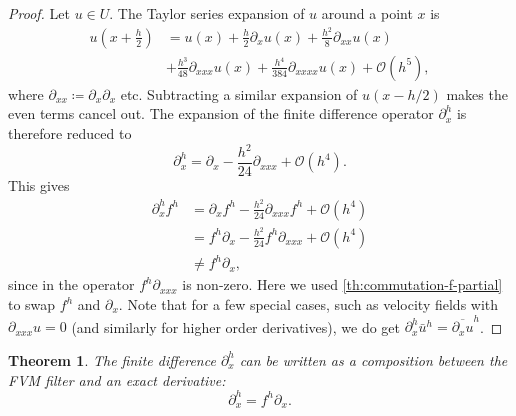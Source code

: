 \documentclass[preprint,twocolumn,5p]{elsarticle}
\newtheorem{theorem}{Theorem}
\begin{document}
\begin{proof}
    Let $u \in U$.
    The Taylor series expansion of $u$ around a point $x$ is
    \begin{equation}
    \begin{split}
        u\left(x + \frac{h}{2}\right)
        & = u(x)
        + \frac{h}{2} \partial_x u(x)
        + \frac{h^2}{8} \partial_{x x} u(x) \\
        & + \frac{h^3}{48} \partial_{x x x} u(x)
        + \frac{h^4}{384} \partial_{x x x x} u(x)
        + \mathcal{O}(h^5),
    \end{split}
    \end{equation}
    where $\partial_{x x} \coloneq \partial_x \partial_x$ etc.
    Subtracting a similar expansion of $u(x - h / 2)$ makes the even terms
    cancel out. The expansion of the finite difference operator $\partial^h_x$ is
    therefore reduced to
    \begin{equation}
        \partial^h_x = \partial_x - \frac{h^2}{24} \partial_{x x x} + \mathcal{O}(h^4).
    \end{equation}
    This gives
    \begin{equation}
        \begin{split}
            \partial^h_x f^h
            & = \partial_x f^h - \frac{h^2}{24} \partial_{x x x} f^h + \mathcal{O}(h^4) \\
            & = f^h \partial_x - \frac{h^2}{24} f^h \partial_{x x x} + \mathcal{O}(h^4) \\
            & \neq f^h \partial_x,
        \end{split}
    \end{equation}
    since in the operator $f^h \partial_{x x x}$ is non-zero. Here we used
    \cref{th:commutation-f-partial} to swap $f^h$ and $\partial_x$.
    Note that for a few special cases,
    such as velocity fields with $\partial_{x x x} u = 0$
    (and similarly for higher order derivatives),
    we do get $\partial^h_x \bar{u}^h = \overline{\partial_x u}^h$.
\end{proof}

\begin{theorem} \label{th:commutation-fh}
    The finite difference $\partial^h_x$ can be written as a composition between
    the FVM filter and an exact derivative:
    \begin{equation}
        \partial^h_x = f^h \partial_x.
    \end{equation}
\end{theorem}
\end{document}
